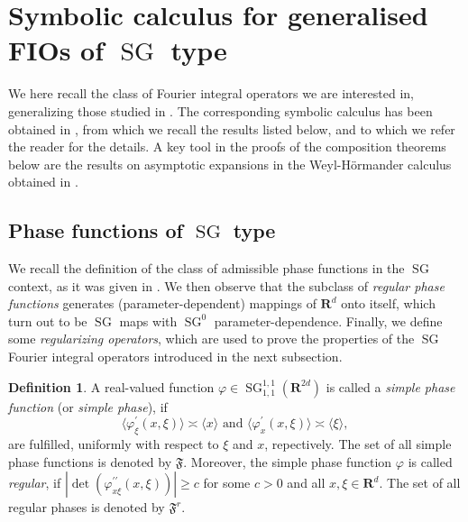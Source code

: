\documentclass[12pt,a4paper,reqno]{amsart}
\numberwithin{equation}{section}
\numberwithin{thm}{section}
\theoremstyle{definition}
\newtheorem{defn}[thm]{Definition}
\theoremstyle{remark}
\begin{document}
\par

\section{Symbolic calculus for generalised FIOs of ${\operatorname{SG}}$ type}
\label{sec2}

We here recall the class of Fourier integral operators we are interested in,
generalizing those studied in \cite{coriasco}. The corresponding symbolic
calculus has been obtained in \cite{CoTo2}, from which we recall the results
listed below, and to which we refer the reader for the details. A key tool in the proofs of the composition theorems below are the results on asymptotic expansions in the Weyl-H\"ormander calculus obtained in \cite{CoTo}.

\subsection{Phase functions of ${\operatorname{SG}}$ type}\label{subs:2.1}
We recall the definition of the class of admissible phase functions in 
the ${\operatorname{SG}}$ context, as it was given in \cite{coriasco}. We then observe
that the subclass of \emph{regular phase functions} generates
(parameter-dependent) mappings of ${\mathbf R^{d}}$ onto itself, which turn
out to be ${\operatorname{SG}}$ maps with ${\operatorname{SG}}^0$ parameter-dependence.
Finally, we define some \emph{regularizing operators},
which are used to prove the properties of the ${\operatorname{SG}}$ Fourier integral
operators introduced in the next subsection.

\par

\begin{defn}\label{def:2.1}
A real-valued function $\varphi \in {\operatorname{SG}}^{1,1}_{1,1}({\mathbf R^{{2d}}})$
is called a \emph{simple phase function} (or \emph{simple phase}), if
\begin{equation}
\label{eq:2.0}
{\langle{\varphi_{\xi}^\prime(x,\xi)}\rangle} \asymp {\langle{x}\rangle}
       \mbox{ and }   
 {\langle{\varphi_{x}^\prime(x,\xi)}\rangle} \asymp {\langle{\xi}\rangle},
\end{equation} 
are fulfilled, uniformly with respect to $\xi$ and $x$, repectively. 
The set of all simple phase functions is denoted by ${\mathfrak{F}}$.
Moreover, the simple phase function $\varphi$ is called \emph{regular},
if $\left|\det (\varphi^{\prime\prime}_{x \xi} (x,\xi) ) \right| \ge c$ for some $c>0$
and all $x,\xi \in {\mathbf R^{d}}$. The set of all regular phases is denoted by ${\mathfrak{F}^r}$.
\end{defn}
\end{document}

